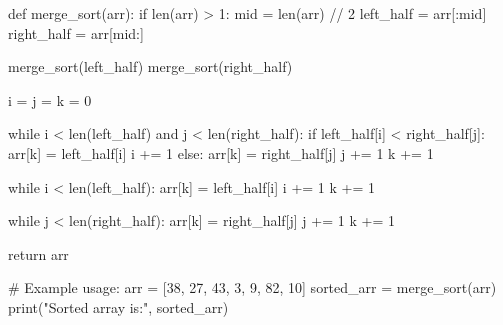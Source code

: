 \documentclass[14pt,oneside]{scrbook}
\newenvironment{Shaded}{}{}
\newcommand{\BuiltInTok}[1]{\textcolor[rgb]{0.84,0.23,0.29}{#1}}
\newcommand{\CommentTok}[1]{\textcolor[rgb]{0.42,0.45,0.49}{#1}}
\newcommand{\ControlFlowTok}[1]{\textcolor[rgb]{0.84,0.23,0.29}{#1}}
\newcommand{\DecValTok}[1]{\textcolor[rgb]{0.00,0.36,0.77}{#1}}
\newcommand{\KeywordTok}[1]{\textcolor[rgb]{0.84,0.23,0.29}{#1}}
\newcommand{\NormalTok}[1]{\textcolor[rgb]{0.14,0.16,0.18}{#1}}
\newcommand{\OperatorTok}[1]{\textcolor[rgb]{0.14,0.16,0.18}{#1}}
\newcommand{\StringTok}[1]{\textcolor[rgb]{0.01,0.18,0.38}{#1}}
\begin{document}
\begin{Shaded}
\begin{Highlighting}[]
\KeywordTok{def}\NormalTok{ merge\_sort(arr):}
    \ControlFlowTok{if} \BuiltInTok{len}\NormalTok{(arr) }\OperatorTok{\textgreater{}} \DecValTok{1}\NormalTok{:}
\NormalTok{        mid }\OperatorTok{=} \BuiltInTok{len}\NormalTok{(arr) }\OperatorTok{//} \DecValTok{2}
\NormalTok{        left\_half }\OperatorTok{=}\NormalTok{ arr[:mid]}
\NormalTok{        right\_half }\OperatorTok{=}\NormalTok{ arr[mid:]}

\NormalTok{        merge\_sort(left\_half)}
\NormalTok{        merge\_sort(right\_half)}

\NormalTok{        i }\OperatorTok{=}\NormalTok{ j }\OperatorTok{=}\NormalTok{ k }\OperatorTok{=} \DecValTok{0}

        \ControlFlowTok{while}\NormalTok{ i }\OperatorTok{\textless{}} \BuiltInTok{len}\NormalTok{(left\_half) }\KeywordTok{and}\NormalTok{ j }\OperatorTok{\textless{}} \BuiltInTok{len}\NormalTok{(right\_half):}
            \ControlFlowTok{if}\NormalTok{ left\_half[i] }\OperatorTok{\textless{}}\NormalTok{ right\_half[j]:}
\NormalTok{                arr[k] }\OperatorTok{=}\NormalTok{ left\_half[i]}
\NormalTok{                i }\OperatorTok{+=} \DecValTok{1}
            \ControlFlowTok{else}\NormalTok{:}
\NormalTok{                arr[k] }\OperatorTok{=}\NormalTok{ right\_half[j]}
\NormalTok{                j }\OperatorTok{+=} \DecValTok{1}
\NormalTok{            k }\OperatorTok{+=} \DecValTok{1}

        \ControlFlowTok{while}\NormalTok{ i }\OperatorTok{\textless{}} \BuiltInTok{len}\NormalTok{(left\_half):}
\NormalTok{            arr[k] }\OperatorTok{=}\NormalTok{ left\_half[i]}
\NormalTok{            i }\OperatorTok{+=} \DecValTok{1}
\NormalTok{            k }\OperatorTok{+=} \DecValTok{1}

        \ControlFlowTok{while}\NormalTok{ j }\OperatorTok{\textless{}} \BuiltInTok{len}\NormalTok{(right\_half):}
\NormalTok{            arr[k] }\OperatorTok{=}\NormalTok{ right\_half[j]}
\NormalTok{            j }\OperatorTok{+=} \DecValTok{1}
\NormalTok{            k }\OperatorTok{+=} \DecValTok{1}

    \ControlFlowTok{return}\NormalTok{ arr}

\CommentTok{\# Example usage:}
\NormalTok{arr }\OperatorTok{=}\NormalTok{ [}\DecValTok{38}\NormalTok{, }\DecValTok{27}\NormalTok{, }\DecValTok{43}\NormalTok{, }\DecValTok{3}\NormalTok{, }\DecValTok{9}\NormalTok{, }\DecValTok{82}\NormalTok{, }\DecValTok{10}\NormalTok{]}
\NormalTok{sorted\_arr }\OperatorTok{=}\NormalTok{ merge\_sort(arr)}
\BuiltInTok{print}\NormalTok{(}\StringTok{"Sorted array is:"}\NormalTok{, sorted\_arr)}
\end{Highlighting}
\end{Shaded}
\end{document}
